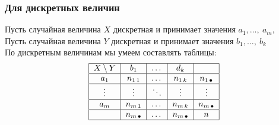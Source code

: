 \documentclass[12pt, a4paper]{article}
\begin{document}
\subsubsection*{Для дискретных величин}
Пусть случайная величина $X$ дискретная и принимает значения $a_1,\dots,\ a_m$,\\
Пусть случайная величина $Y$ дискретная и принимает значения $b_1,\dots,\ b_k$\\
По дискретным величинам мы умеем составлять таблицы:
\[
\begin{tabular}{|c|c|c|c|c|}
    \hline
    $X\setminus Y$ & $b_1$ & $\dots$ & $d_k$ & \\
    \hline
    $a_1$          & $n_{1\, 1}$ & $\dots$ & $n_{1\, k}$ & $n_{1\, \bullet}$\\
    \hline
    $\vdots$       & $\vdots$ & $\ddots$ & $\vdots$ & $\vdots$\\
    \hline
    $a_m$          & $n_{m\, 1}$ & $\dots$ & $n_{m\, k}$ & $n_{m\, \bullet}$\\
    \hline
                 & $n_{m\, \bullet}$ & $\dots$ & $n_{m\, \bullet}$ & $n$\\
    \hline
\end{tabular}
\]
\end{document}
